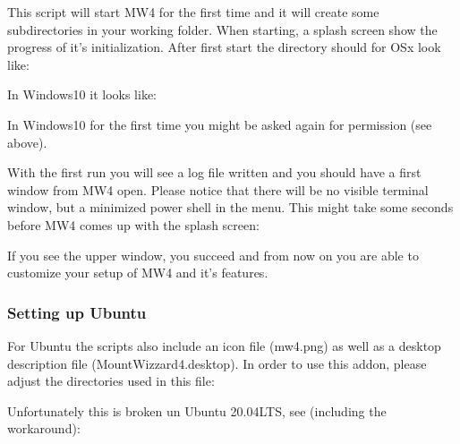 \documentclass[a4paper,10pt,english]{sphinxmanual}
\begin{document}
\sphinxAtStartPar
This script will start MW4 for the first time and it will create some
subdirectories in your working folder. When starting, a splash screen show the
progress of it’s initialization. After first start the directory should for OSx
look like:


\sphinxAtStartPar
In Windows10 it looks like:


\sphinxAtStartPar
In Windows10 for the first time you might be asked again for permission (see above).

\sphinxAtStartPar
With the first run you will see a log file written and you should have a first
window from MW4 open. Please notice that there will be no visible terminal window,
but a minimized power shell in the menu. This might take some seconds before MW4
comes up with the splash screen:


\sphinxAtStartPar
If you see the upper window, you succeed and from now on you are able to customize your
setup of MW4 and it’s features.


\subsubsection{Setting up Ubuntu}
\label{\detokenize{install/mw4:setting-up-ubuntu}}
\sphinxAtStartPar
For Ubuntu the scripts also include an icon file (mw4.png) as well as a desktop
description file (MountWizzard4.desktop). In order to use this add\sphinxhyphen{}on, please
adjust the directories used in this file:


\sphinxAtStartPar
Unfortunately this is broken un Ubuntu 20.04LTS, see (including the workaround):

\sphinxAtStartPar
{}
\end{document}
